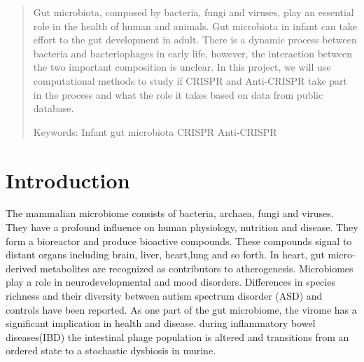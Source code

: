 \documentclass[a4paper]{article}
\theoremstyle{definition}
\numberwithin{equation}{section}
\begin{document}



\newpage
%
\fancyhead{}
\fancyfoot{}
\pagestyle{fancy} 
\fancyhead[RO,LE]{\sffamily\small \thepage}
\fancyhead[LO,RE]{\sffamily\small \nouppercase{\rightmark}}
\renewcommand{\headrulewidth}{0.4pt}
\renewcommand{\footrulewidth}{0.0pt}
%
%
%
%




\begin{abstract}
Gut microbiota, composed by bacteria, fungi and viruses, play an essential role in the health of human and animals. Gut microbiota in infant can take effort to the gut development in adult. There is a dynamic process between bacteria and bacteriophages in early life, however, the interaction between the two important composition is unclear. In this project, we will use computational methods to study if CRISPR and Anti-CRISPR take part in the process and what the role it takes based on data from public database.

 Keywords: Infant gut microbiota CRISPR Anti-CRISPR
\end{abstract}
\section{Introduction}
The mammalian microbiome consists of bacteria, archaea, fungi and viruses\citep{lynch2016human}. They have a profound influence on human physiology, nutrition and disease\citep{qin2010human}. They form a bioreactor and produce bioactive compounds. These compounds signal to distant organs including brain, liver, heart,lung and so forth\citep{schroeder2016signals}. In heart, gut micro-derived metabolites are recognized as contributors to atherogenesis\citep{wang2011gut}.  Microbiomes play a role in neurodevelopmental and mood disorders\citep{de2014food}. Differences in species richness and their diversity between autism spectrum disorder (ASD) and controls have been reported\citep{williams2012application}. As one part of the gut microbiome, the virome has a significant implication in health and disease\citep{virgin2014virome}. during inflammatory bowel diseases(IBD) the intestinal phage population is altered and transitions from an ordered state to a stochastic dysbiosis in murine\citep{duerkop2018murine}.
\end{document}
